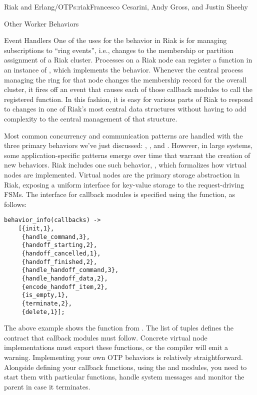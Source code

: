 \begin{aosachapter}{Riak and Erlang/OTP}{s:riak}{Francesco Cesarini, Andy Gross, and Justin Sheehy}
\begin{aosasect1}{Other Worker Behaviors}
\begin{aosasect2}{Event Handlers}
One of the uses for the  behavior in Riak is for
managing subscriptions to ``ring events'', i.e., changes to the
membership or partition assignment of a Riak cluster.  Processes on a
Riak node can register a function in an instance of
, which implements the
 behavior.  Whenever the central process managing the
ring for that node changes the membership record for the overall
cluster, it fires off an event that causes each of those callback
modules to call the registered function.  In this fashion, it is
easy for various parts of Riak to respond to changes in one of Riak's
most central data structures without having to add complexity to the
central management of that structure.

Most common concurrency and communication patterns are handled with
the three primary behaviors we've just discussed: ,
, and .  However, in large systems,
some application-specific patterns emerge over time that warrant the
creation of new behaviors.  Riak includes one such behavior,
, which formalizes how virtual nodes are
implemented.  Virtual nodes are the primary storage abstraction in
Riak, exposing a uniform interface for key-value storage to the
request-driving FSMs.  The interface for callback modules is specified
using the  function, as follows:


\begin{verbatim}
behavior_info(callbacks) ->
    [{init,1},
     {handle_command,3},
     {handoff_starting,2},
     {handoff_cancelled,1},
     {handoff_finished,2},
     {handle_handoff_command,3},
     {handle_handoff_data,2},
     {encode_handoff_item,2},
     {is_empty,1},
     {terminate,2},
     {delete,1}];
\end{verbatim}

\noindent The above example shows the  function from
.  The list of  tuples defines the contract that callback modules must
follow.  Concrete virtual node implementations must export these
functions, or the compiler will emit a warning. Implementing your own
OTP behaviors is relatively straightforward. Alongside defining your
callback functions, using the  and  modules,
you need to start them with particular functions, handle system
messages and monitor the parent in case it terminates.

\end{aosasect2}


\end{aosasect1}
\end{aosachapter}
